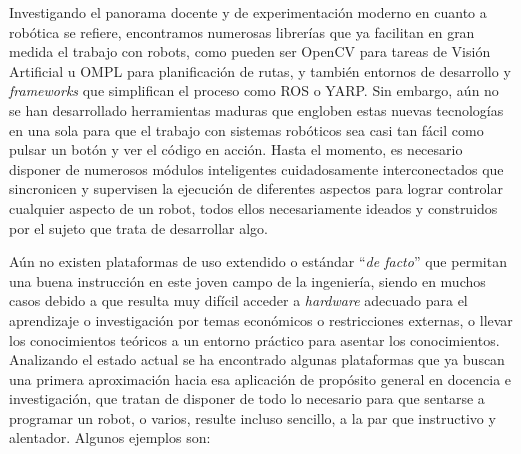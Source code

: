 Investigando el panorama docente y de experimentación moderno en cuanto a robótica se refiere, encontramos numerosas librerías que ya facilitan en gran medida el trabajo con robots, como pueden ser OpenCV para tareas de Visión Artificial u OMPL para planificación de rutas, y también entornos de desarrollo y \textit{frameworks} que simplifican el proceso como ROS o YARP. 
Sin embargo, aún no se han desarrollado herramientas maduras que engloben estas nuevas tecnologías en una sola para que el trabajo con sistemas robóticos sea casi tan fácil como pulsar un botón y ver el código en acción. Hasta el momento, es necesario disponer de numerosos módulos inteligentes cuidadosamente interconectados que sincronicen y supervisen la ejecución de diferentes aspectos para lograr controlar cualquier aspecto de un robot, todos ellos necesariamente ideados y construidos por el sujeto que trata de desarrollar algo.

Aún no existen plataformas de uso extendido o estándar ``\textit{de facto}'' que permitan una buena instrucción en este joven campo de la ingeniería, siendo en muchos casos debido a que resulta muy difícil acceder a \textit{hardware} adecuado para el aprendizaje o investigación por temas económicos o restricciones externas, o llevar los conocimientos teóricos a un entorno práctico para asentar los conocimientos. Analizando el estado actual se ha encontrado algunas plataformas que ya buscan una primera aproximación hacia esa aplicación de propósito general en docencia e investigación, que tratan de disponer de todo lo necesario para que sentarse a programar un robot, o varios, resulte incluso sencillo, a la par que instructivo y alentador. Algunos ejemplos son:

